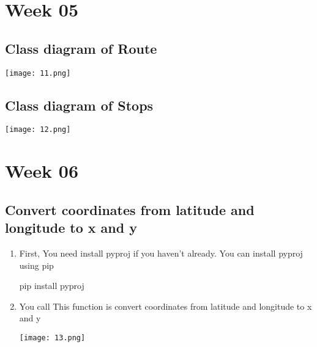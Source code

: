 \documentclass[12pt]{scrartcl}
\begin{document}
\section{Week 05}
\subsection{Class diagram of Route}
        \begin{center}
            \texttt{[image: 11.png]}
        \end{center}
\subsection{Class diagram of Stops}
        \begin{center}
            \texttt{[image: 12.png]}
        \end{center}

\newpage

\section{Week 06}
\subsection{Convert coordinates from latitude and longitude to x and y}
    \begin{enumerate}
    \item  First, You need install pyproj if you  haven't already. You can install pyproj using pip
    
     \begin{gitbox} 
        pip install pyproj
     \end{gitbox}
     \item You call This function is convert coordinates from latitude and longitude to x and y
        \begin{center}
            \texttt{[image: 13.png]}
        \end{center}
    \end{enumerate}
\end{document}

